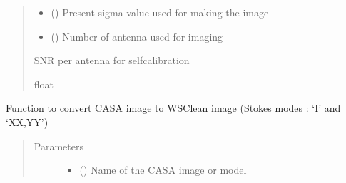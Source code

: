 \documentclass[letterpaper,10pt,english]{sphinxmanual}
\begin{document}
\begin{fulllineitems}
\begin{fulllineitems}
\begin{quote}
\begin{description}
\begin{itemize}
\item {} 
\sphinxAtStartPar
{} () \textendash{} Present sigma value used for making the image

\item {} 
\sphinxAtStartPar
{} () \textendash{} Number of antenna used for imaging

\end{itemize}

\item[{Returns}] \leavevmode
\sphinxAtStartPar
SNR per antenna for self\sphinxhyphen{}calibration

\item[{Return type}] \leavevmode
\sphinxAtStartPar
float

\end{description}\end{quote}

\end{fulllineitems}


\begin{fulllineitems}
\label{\detokenize{paircars:paircars.intensity_selfcal_LTS.IntensitySelfcal.casaimage_to_wsclean}}
\sphinxAtStartPar
Function to convert CASA image to WSClean image
(Stokes modes : ‘I’ and ‘XX,YY’)
\begin{quote}\begin{description}
\item[{Parameters}] \leavevmode\begin{itemize}
\item {} 
\sphinxAtStartPar
{} () \textendash{} Name of the CASA image or model


\end{itemize}
\end{description}
\end{quote}
\end{fulllineitems}
\end{fulllineitems}
\end{document}
